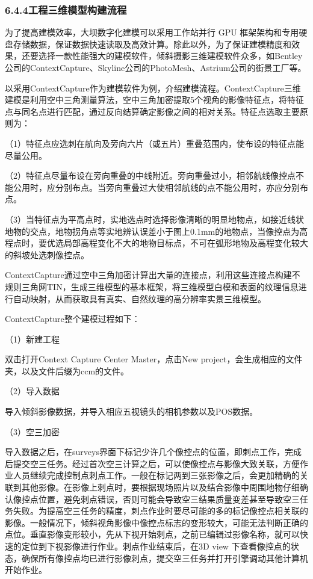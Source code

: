 \subsubsection{6.4.4工程三维模型构建流程}\label{ux5de5ux7a0bux4e09ux7ef4ux6a21ux578bux6784ux5efaux6d41ux7a0b}

为了提高建模效率，大坝数字化建模可以采用工作站并行 GPU 框架架构和专用硬盘存储数据，保证数据快速读取及高效计算。除此以外，为了保证建模精度和效果，还要选择一款性能强大的建模软件，倾斜摄影三维建模软件众多，如Bentley公司的ContextCapture、Skyline公司的PhotoMesh、Astrium公司的街景工厂等。

以采用ContextCapture作为建模软件为例，介绍建模流程。ContextCapture三维建模是利用空中三角测量算法，空中三角加密提取5个视角的影像特征点，将特征点与同名点进行匹配，通过反向结算确定影像之间的相对关系。特征点选取主要原则为：

（1）特征点应选刺在航向及旁向六片（或五片）重叠范围内，使布设的特征点能尽量公用。

（2）特征点尽量布设在旁向重叠的中线附近。旁向重叠过小，相邻航线像控点不能公用时，应分别布点。当旁向重叠过大使相邻航线的点不能公用时，亦应分别布点。

（3）当特征点为平高点时，实地选点时选择影像清晰的明显地物点，如接近线状地物的交点，地物拐角点等实地辨认误差小于图上0.1mm的地物点，当像控点为高程点时，要优选局部高程变化不大的地物目标点，不可在弧形地物及高程变化较大的斜坡处选刺像控点。

ContextCapture通过空中三角加密计算出大量的连接点，利用这些连接点构建不规则三角网TIN，生成三维模型的基本框架，将三维模型白模和表面的纹理信息进行自动映射，从而获取具有真实、自然纹理的高分辨率实景三维模型。

ContextCapture整个建模过程如下：

（1）新建工程

双击打开Context Capture Center Master，点击New project，会生成相应的文件夹，以及文件后缀为ccm的文件。

（2）导入数据

导入倾斜影像数据，并导入相应五视镜头的相机参数以及POS数据。

（3）空三加密

导入数据之后，在surveys界面下标记少许几个像控点的位置，即刺点工作，完成后提交空三任务。经过首次空三计算之后，可以使像控点与影像大致关联，方便作业人员继续完成控制点刺点工作。一般在标记两到三张影像之后，会更加精确的关联到其他影像。在影像上刺点时，要根据现场照片以及结合影像中周围地物仔细确认像控点位置，避免刺点错误，否则可能会导致空三结果质量变差甚至导致空三任务失败。为提高空三任务的精度，刺点作业时要尽可能的多的标记像控点相关联的影像。一般情况下，倾斜视角影像中像控点标志的变形较大，可能无法判断正确的点位。垂直影像变形较小，先从下视开始刺点，之前已编辑过影像名称，就可以快速的定位到下视影像进行作业。刺点作业结束后，在3D view 下查看像控点的状态，确保所有像控点均已进行影像刺点，提交空三任务并打开引擎调动其他计算机开始作业。

